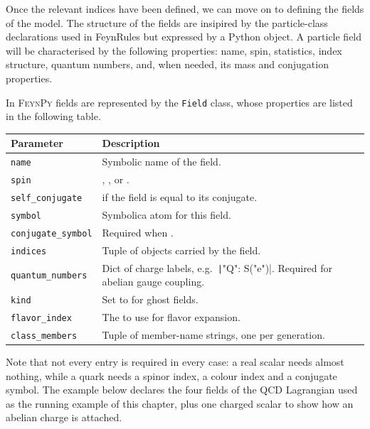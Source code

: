 Once the relevant indices have been defined, we can move on to defining the fields of the model. The structure of the fields are insipired by the particle-class declarations used in FeynRules but expressed by a Python object. A particle field will be characterised by the following properties: name, spin, statistics, index structure, quantum numbers, and, when needed, its mass and conjugation properties.

In \textsc{FeynPy} fields are represented by the \texttt{Field} class, whose properties are listed in the following table.

\begin{center}
\begin{tabular}{@{}P{3.8cm}p{8.5cm}@{}}
\toprule
\normalfont\textbf{Parameter} & \textbf{Description} \\
\midrule
\texttt{name}              & Symbolic name of the field. \\
\texttt{spin}              & , , or . \\
\texttt{self\_conjugate}   &  if the field is equal to its conjugate. \\
\texttt{symbol}            & Symbolica atom for this field. \\
\texttt{conjugate\_symbol} & Required when . \\
\texttt{indices}           & Tuple of  objects carried by the field. \\
\texttt{quantum\_numbers}  & Dict of charge labels, e.g.\ \texttt|{"Q": S("e")}|. Required for abelian gauge coupling. \\
\texttt{kind}              & Set to  for ghost fields. \\
\texttt{flavor\_index}     & The  to use for flavor expansion. \\
\texttt{class\_members}    & Tuple of member-name strings, one per generation. \\
\bottomrule
\end{tabular}
\end{center}


\noindent
Note that not every entry is required in every case: a real scalar needs almost nothing, while a quark needs a spinor index, a colour index and a conjugate symbol. The example below declares the four fields of the QCD Lagrangian used as the running example of this chapter, plus one charged scalar to show how an abelian charge is attached.

